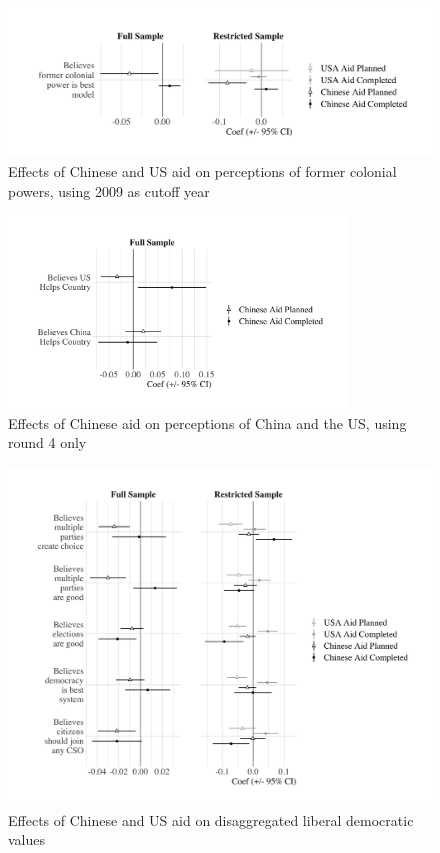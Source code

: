 \documentclass[9pt]{article}
\begin{document}
\begin{figure}[H]
\centering
\includegraphics[width=1\textwidth]{figures/figure_a7.png}
\caption{Effects of Chinese and US aid on perceptions of former colonial powers, using 2009 as cutoff year}
\end{figure}

\begin{figure}[H]
\centering
\includegraphics[width=0.8\textwidth]{figures/figure_a16.png} %
\caption{Effects of Chinese aid on perceptions of China and the US, using round 4 only}
\end{figure}

\begin{figure}[H]
\centering
\includegraphics[width=1\textwidth]{figures/figure_a19.png} %
\caption{Effects of Chinese and US aid on disaggregated liberal democratic values}
\end{figure}
\end{document}
